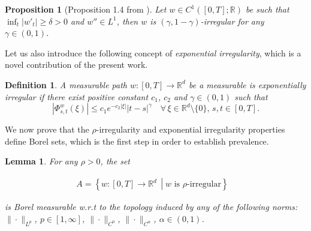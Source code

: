 \documentclass[10pt]{article}
\newcommand{\tmtextit}[1]{{\itshape{#1}}}
\newtheorem{definition}[theorem]{Definition}
\newtheorem{lemma}[theorem]{Lemma}
\newtheorem{proposition}[theorem]{Proposition}
{\theorembodyfont{\rmfamily}\newtheorem{remark}[theorem]{Remark}}
\begin{document}
\begin{proposition}[Proposition 1.4 from {\cite{choukgubinelli1}}]
  \label{sec2.2 prop d=1}Let $w \in C^1 ([0, T] ; \mathbb{R})$ be such that
  $\inf_t | w'_t | \geqslant \delta > 0$ and $w'' \in L^1$, then $w$ is
  $(\gamma, 1 - \gamma)$\mbox{-}irregular for any $\gamma \in (0, 1)$.
\end{proposition}

Let us also introduce the following concept of \tmtextit{exponential
irregularity}, which is a novel contribution of the present work.

\begin{definition}
  \label{sec2.2 defn exp irregularity}A measurable path $w : [0, T]
  \rightarrow \mathbb{R}^d$ be a measurable is exponentially irregular if
  there exist positive constant $c_1$, $c_2$ and $\gamma \in (0, 1)$ such that
  \begin{equation}
    | \Phi^w_{s, t} (\xi) | \leqslant c_1 e^{- c_2 | \xi |} | t - s |^{\gamma}
    \quad \forall \, \xi \in \mathbb{R}^d \setminus \{ 0 \}, \, s, t \in [0,
    T] . \label{sec2.2 defn exp irr}
  \end{equation}
\end{definition}

We now prove that the $\rho$\mbox{-}irregularity and exponential irregularity
properties define Borel sets, which is the first step in order to establish
prevalence.

\begin{lemma}
  \label{sec2.2 lemma borel rho irr}For any $\rho > 0$, the set
  
  \begin{align}
    A = \left\{ w : [0, T] \rightarrow \mathbb{R}^d \, \middle| \text{$w$ is
    $\rho$-irregular} \right\} & 
  \end{align}
  
  is Borel measurable w.r.t to the topology induced by any of the following
  norms: $\| \cdot \|_{L^p}$, $p \in [1, \infty]$, $\| \cdot \|_{C^0}$, $\|
  \cdot \|_{C^{\alpha}}$, $\alpha \in (0, 1)$.
\end{lemma}
\end{document}
